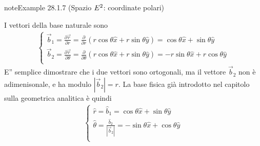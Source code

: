 \documentclass[letterpaper,10pt,italian]{jupyterBook}
\begin{document}
\begin{sphinxadmonition}{note}{Example 28.1.7 (Spazio \protect\(E^2\protect\): coordinate polari)}



\sphinxAtStartPar
I vettori della base naturale sono
\begin{equation*}
\begin{split}\begin{cases}
  \vec{b}_1 = \frac{\partial \vec{r}}{\partial r     } = \frac{\partial }{\partial r     } \left( r \cos \theta \hat{x} + r \sin \theta \hat{y} \right) = \cos \theta \hat{x} + \sin \theta \hat{y} \\
  \vec{b}_2 = \frac{\partial \vec{r}}{\partial \theta} = \frac{\partial }{\partial \theta} \left( r \cos \theta \hat{x} + r \sin \theta \hat{y} \right) = -r\sin \theta \hat{x} + r \cos \theta\hat{y} \\
\end{cases}\end{split}
\end{equation*}
\sphinxAtStartPar
E” semplice dimostrare che i due vettori sono ortogonali, ma il vettore \(\vec{b}_2\) non è adimenisonale, e ha modulo \(|\vec{b}_2| = r\). La base fisica \sphinxhyphen{} già introdotto nel capitolo sulla geometrica analitica   \sphinxhyphen{} è quindi
\begin{equation*}
\begin{split}\begin{cases}
  \hat{r}      = \hat{b}_1 = \cos \theta \hat{x} + \sin \theta \hat{y} \\
  \hat{\theta} = \frac{\hat{b}_2}{|\vec{b}_2|} = - \sin \theta \hat{x} + \cos \theta \hat{y} \\
\end{cases}\end{split}
\end{equation*}\end{sphinxadmonition}
\label{ch/vector-calculus/geometry:example-10}
\end{document}

